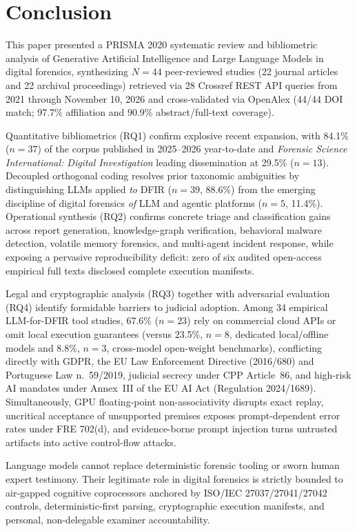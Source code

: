 \section{Conclusion}
\label{sec:conclusion}

This paper presented a PRISMA 2020 systematic review and bibliometric analysis of Generative Artificial Intelligence and Large Language Models in digital forensics, synthesizing $N=44$ peer-reviewed studies (22 journal articles and 22 archival proceedings) retrieved via 28 Crossref REST API queries from 2021 through November 10, 2026 and cross-validated via OpenAlex (44/44 DOI match; 97.7\% affiliation and 90.9\% abstract/full-text coverage).

Quantitative bibliometrics (RQ1) confirm explosive recent expansion, with 84.1\% ($n=37$) of the corpus published in 2025--2026 year-to-date and \textit{Forensic Science International: Digital Investigation} leading dissemination at 29.5\% ($n=13$). Decoupled orthogonal coding resolves prior taxonomic ambiguities by distinguishing LLMs applied \textit{to} DFIR ($n=39$, 88.6\%) from the emerging discipline of digital forensics \textit{of} LLM and agentic platforms ($n=5$, 11.4\%). Operational synthesis (RQ2) confirms concrete triage and classification gains across report generation, knowledge-graph verification, behavioral malware detection, volatile memory forensics, and multi-agent incident response, while exposing a pervasive reproducibility deficit: zero of six audited open-access empirical full texts disclosed complete execution manifests.

Legal and cryptographic analysis (RQ3) together with adversarial evaluation (RQ4) identify formidable barriers to judicial adoption. Among 34 empirical LLM-for-DFIR tool studies, 67.6\% ($n=23$) rely on commercial cloud APIs or omit local execution guarantees (versus 23.5\%, $n=8$, dedicated local/offline models and 8.8\%, $n=3$, cross-model open-weight benchmarks), conflicting directly with GDPR, the EU Law Enforcement Directive (2016/680) and Portuguese Law n.{\textordmasculine}~59/2019, judicial secrecy under CPP Article~86, and high-risk AI mandates under Annex~III of the EU AI Act (Regulation 2024/1689). Simultaneously, GPU floating-point non-associativity disrupts exact replay, uncritical acceptance of unsupported premises exposes prompt-dependent error rates under FRE 702(d), and evidence-borne prompt injection turns untrusted artifacts into active control-flow attacks.

Language models cannot replace deterministic forensic tooling or sworn human expert testimony. Their legitimate role in digital forensics is strictly bounded to air-gapped cognitive coprocessors anchored by ISO/IEC 27037/27041/27042 controls, deterministic-first parsing, cryptographic execution manifests, and personal, non-delegable examiner accountability.

